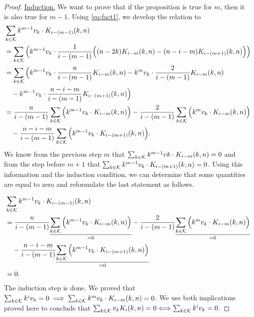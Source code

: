 \begin{proof}
    \underline{Induction.} We want to prove that if the proposition is true for $m$, then it is also true for $m - 1$. Using \cref{eq:fact1}, we develop the relation to
    \begin{equation*}
        \begin{split}
            & \sum_{k \in \mathcal{K}} k^{m-1}v_k \cdot K_{i-(m-1)}(k,n)\\
            &= \sum_{k \in \mathcal{K}} \Big( k^{m-1}v_k \cdot \frac{1}{i-(m-1)}\Big( (n-2k)K_{i-m}(k,n) - (n-i-m)K_{i-(m+1)}(k,n) \Big)\Big)\\
            &= \sum_{k \in \mathcal{K}} \Big( k^{m-1}v_k \cdot \frac{n}{i-(m-1)}K_{i-m}(k,n) - k^m v_k \cdot \frac{2}{i-(m-1)}K_{i-m}(k,n)\\
            &\quad -k^{m-1}v_k \cdot\frac{n-i-m}{i-(m-1)}K_{i-(m+1)}(k,n) \Big)\\
            &= \frac{n}{i-(m-1)}\sum_{k \in \mathcal{K}} \Big(k^{m-1}v_k\cdot K_{i-m}(k,n) \Big) - \frac{2}{i-(m-1)}\sum_{k \in \mathcal{K}} \Big(k^mv_k\cdot K_{i-m}(k,n)\Big)\\
            &\quad -\frac{n-i-m}{i-(m-1)}\sum_{k \in \mathcal{K}}\Big(k^{m-1}v_k\cdot K_{i-(m+1)}(k,n)\Big).
        \end{split}
    \end{equation*}
    We know from the previous step $m$ that $\sum_{k \in \mathcal{K}} k^{m-1}vk\cdot K_{i-m}(k,n) = 0$ and from the step before $m+1$ that $\sum_{k \in \mathcal{K}} k^{m-1}v_k\cdot K_{i-(m+1)}(k,n) = 0$. Using this information and the induction condition, we can determine that some quantities are equal to zero and reformulate the last statement as follows.

    \begin{equation*}
        \begin{split}
            & \sum_{k \in \mathcal{K}} k^{m-1}v_k \cdot K_{i-(m-1)}(k,n)\\
            &= \frac{n}{i-(m-1)}\underset{=0}{\underline{\sum_{k \in \mathcal{K}} \Big(k^{m-1}v_k\cdot K_{i-m}(k,n) \Big)}} - \frac{2}{i-(m-1)}\underset{=0}{\underline{\sum_{k \in \mathcal{K}} \Big(k^mv_k\cdot K_{i-m}(k,n)\Big)}}\\
            &\quad -\frac{n-i-m}{i-(m-1)}\underset{=0}{\underline{\sum_{k \in \mathcal{K}}\Big(k^{m-1}v_k\cdot K_{i-(m+1)}(k,n)\Big)}}\\
            &= 0.
        \end{split}
    \end{equation*}
    The induction step is done. We proved that $\sum_{k \in \mathcal{K}} k^iv_k = 0 \implies \sum_{k \in \mathcal{K}} k^mv_k\cdot K_{i-m}(k,n) = 0$.
    We use both implications proved here to conclude that $\sum_{k \in \mathcal{K}} v_kK_i(k,n) = 0 \Longleftrightarrow \sum_{k \in \mathcal{K}} k^iv_k = 0$.
\end{proof}


